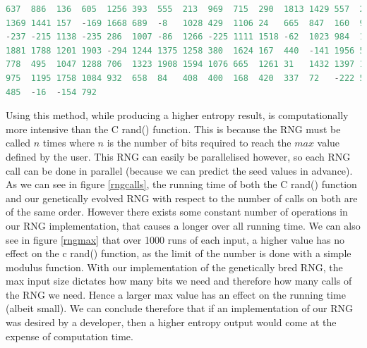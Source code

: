 \documentclass[a4paper,10.5pt]{article}
\begin{document}
\begin{lstlisting}[language=C, basicstyle=\small]
637  886  136  605  1256 393  555  213  969  715  290  1813 1429 557  26   1317 
1369 1441 157  -169 1668 689  -8   1028 429  1106 24   665  847  160  940  -144
-237 -215 1138 -235 286  1007 -86  1266 -225 1111 1518 -62  1023 984  1218 1235
1881 1788 1201 1903 -294 1244 1375 1258 380  1624 167  440  -141 1956 557  -273
778  495  1047 1288 706  1323 1908 1594 1076 665  1261 31   1432 1397 166  279
975  1195 1758 1084 932  658  84   408  400  168  420  337  72   -222 561  -122
485  -16  -154 792

\end{lstlisting}
Using this method, while producing a higher entropy result, is computationally more intensive than the C rand() function. This is because the RNG must be called $n$ times where $n$ is the number of bits required to reach the $max$ value defined by the user. This RNG can easily be parallelised however, so each RNG call can be done in parallel (because we can predict the seed values in advance). As we can see in figure \ref{rngcalls}, the running time of both the C rand() function and our genetically evolved RNG with respect to the number of calls on both are of the same order. However there exists some constant number of operations in our RNG implementation, that causes a longer over all running time. We can also see in figure \ref{rngmax} that over 1000 runs of each input, a higher value has no effect on the c rand() function, as the limit of the number is done with a simple modulus function. With our implementation of the genetically bred RNG, the max input size dictates how many bits we need and therefore how many calls of the RNG we need. Hence a larger max value has an effect on the running time (albeit small). We can conclude therefore that if an implementation of our RNG was desired by a developer, then a higher entropy output would come at the expense of computation time.
\end{document}
